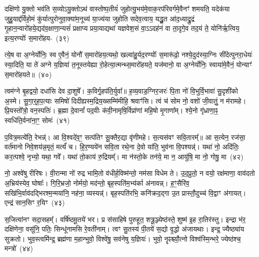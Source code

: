 दक्षि॑णो यु॒क्तो भव॑ति स॒व्यो\-ऽयु॒क्तो\-ऽथ॑ वास्तोष्प॒तीयं॑ जुहोत्यु॒भय॑मे॒वाक॒रप॑रिवर्गमे॒वैनꣳ॑ शमयति॒ यदेक॑या जुहु॒याद्द॑र्विहो॒मं कु॑र्यात्पुरोनुवा॒क्या॑म॒नूच्य॑ या॒ज्य॑या जुहोति सदेव॒त्वाय॒ यद्धु॒त आ॑द॒ध्याद्रु॒द्रं गृ॒हान॒न्वारो॑हये॒द्यद॑व॒\-क्षाणा॒न्यसं॑ प्रक्षाप्य प्रया॒याद्यथा॑ यज्ञवेश॒सं वा॒\-ऽऽ\-दह॑नं वा ता॒दृगे॒व तद॒यं ते॒ योनि॑र्\mbox{}ऋ॒त्विय॒ इत्य॒रण्योः᳚ स॒मारो॑हय-~(३९)\ip

त्ये॒ष वा अ॒ग्नेर्योनिः॒ स्व ए॒वैनं॒ योनौ॑ स॒मारो॑हय॒त्यथो॒ खल्वा॑हु॒र्यद॒रण्योः᳚ स॒मारू॑ढो॒ नश्ये॒दुद॑स्या॒ग्निः सी॑देत्पुनरा॒धेयः॑ स्या॒दिति॒ या ते॑ अग्ने य॒ज्ञिया॑ त॒नूस्तयेह्या रो॒हेत्या॒त्मन्थ्स॒मारो॑हयते॒ यज॑मानो॒ वा अ॒ग्नेर्योनिः॒ स्वाया॑मे॒वैनं॒ योन्याꣳ॑ स॒मारो॑हयते॥~(४०)\ip

{}%

त्वम॑ग्ने बृ॒हद्वयो॒ दधा॑सि देव दा॒शुषे᳚। क॒विर्गृ॒हप॑ति॒र्युवा᳚॥ ह॒व्य॒वाड॒ग्निर॒जरः॑ पि॒ता नो॑ वि॒भुर्वि॒भावा॑ सु॒दृशी॑को अ॒स्मे। सु॒गा॒र्॒\mbox{}ह॒प॒त्याः समिषो॑ दिदीह्यस्म॒द्रिय॒ख्सम्मि॑मीहि॒ श्रवाꣳ॑सि। त्वं च॑ सोम नो॒ वशो॑ जी॒वातुं॒ न म॑रामहे। प्रि॒यस्तो᳚त्रो॒ वन॒स्पतिः॑। ब्र॒ह्मा दे॒वानां᳚ पद॒वीः क॑वी॒नामृषि॒र्विप्रा॑णां महि॒षो मृ॒गाणा᳚म्। श्ये॒नो गृ॑ध्राणा॒ꣴ॒ स्वधि॑ति॒र्वना॑ना॒ꣳ॒ सोमः॑~(४१)\ip

प॒वित्र॒मत्ये॑ति॒ रेभन्न्॑। आ वि॒श्वदे॑व॒ꣳ॒ सत्प॑तिꣳ सू॒क्तैर॒द्या वृ॑णीमहे। स॒त्यस॑वꣳ सवि॒तारम्᳚॥ आ स॒त्येन॒ रज॑सा॒ वर्त॑मानो निवे॒शय॑न्न॒मृतं॒ मर्त्यं॑ च। हि॒र॒ण्यये॑न सवि॒ता रथे॒ना दे॒वो या॑ति॒ भुव॑ना वि॒पश्यन्न्॑। यथा॑ नो॒ अदि॑तिः॒ कर॒त्पश्वे॒ नृभ्यो॒ यथा॒ गवे᳚। यथा॑ तो॒काय॑ रु॒द्रियम्᳚। मा न॑स्तो॒के तन॑ये॒ मा न॒ आयु॑षि॒ मा नो॒ गोषु॒ मा~(४२)\ip

नो॒ अश्वे॑षु रीरिषः। वी॒रान्मा नो॑ रुद्र भामि॒तो व॑धीर्\mbox{}ह॒विष्म॑न्तो॒ नम॑सा विधेम ते। उ॒द॒प्रुतो॒ न वयो॒ रक्ष॑माणा॒ वाव॑दतो अ॒भ्रिय॑स्येव॒ घोषाः᳚। गि॒रि॒भ्रजो॒ नोर्मयो॒ मद॑न्तो॒ बृह॒स्पति॑म॒भ्य॑र्का अ॑नावन्न्। ह॒ꣳ॒सैरि॑व॒ सखि॑भि॒र्वाव॑दद्भिरश्म॒न्मया॑नि॒ नह॑ना॒ व्यस्यन्न्॑। बृह॒स्पति॑रभि॒ कनि॑क्रद॒द्गा उ॒त प्रास्तौ॒दुच्च॑ वि॒द्वाꣳ अ॑गायत्। एन्द्र॑ सान॒सिꣳ र॒यिꣳ~(४३)\ip

स॒जित्वा॑नꣳ सदा॒सहम्᳚। वर्\mbox{}षि॑ष्ठमू॒तये॑ भर। प्र स॑साहिषे पुरुहूत॒ शत्रू॒ञ्ज्येष्ठ॑स्ते॒ शुष्म॑ इ॒ह रा॒तिर॑स्तु। इन्द्रा भ॑र॒ दक्षि॑णेना॒ वसू॑नि॒ पतिः॒ सिन्धू॑नामसि रे॒वती॑नाम्। त्वꣳ सु॒तस्य॑ पी॒तये॑ स॒द्यो वृ॒द्धो अ॑जायथाः। इन्द्र॒ ज्यैष्ठ्या॑य सुक्रतो। भुव॒स्त्वमि॑न्द्र॒ ब्रह्म॑णा म॒हान्भुवो॒ विश्वे॑षु॒ सव॑नेषु य॒ज्ञियः॑। भुवो॒ नॄꣴश्च्यौ॒त्नो विश्व॑स्मि॒न्भरे॒ ज्येष्ठ॑श्च॒ मन्त्रो॑~(४४)\ip

